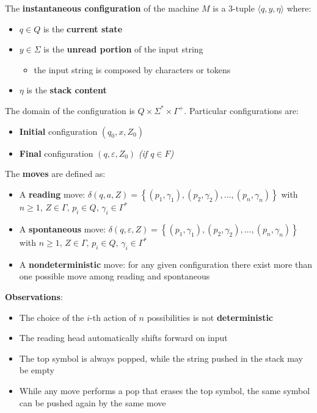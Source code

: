 \documentclass[english]{article}
\begin{document}
\bigskip
The \textbf{instantaneous configuration} of the machine \(M\) is a \(3\)-tuple \(\langle q, y, \eta \rangle\) where:

\begin{itemize}
  \item \(q \in Q\) is the \textbf{current state}
  \item \(y \in \Sigma\) is the \textbf{unread portion} of the input string
        \begin{itemize}
          \item the input string is composed by characters or tokens
        \end{itemize}
  \item \(\eta\) is the \textbf{stack content}
\end{itemize}

The domain of the configuration is \(Q \times \Sigma^\ast \times \Gamma^+\).
Particular configurations are:

\begin{itemize}
  \item \textbf{Initial} configuration \(\left( q_0, x, Z_0 \right)\)
  \item \textbf{Final} configuration \(\left( q, \varepsilon, Z_0 \right)\) \textit{(if \(q \in F\))}
\end{itemize}

\bigskip

The \textbf{moves} are defined as:

\begin{itemize}
  \item A \textbf{reading} move: \(\delta(q, a, Z) = \left\{ (p_1, \gamma_1), (p_2, \gamma_2), \ldots, (p_n, \gamma_n) \right\}\) with \(n \geq 1, \, Z \in \Gamma, \, p_i \in Q, \, \gamma_i \in \Gamma^\ast\)
  \item A \textbf{spontaneous} move: \(\delta(q, \varepsilon, Z) = \left\{ (p_1, \gamma_1), (p_2, \gamma_2), \ldots, (p_n, \gamma_n) \right\}\) with \(n \geq 1, \, Z \in \Gamma, \, p_i \in Q, \, \gamma_i \in \Gamma^\ast\)
  \item A \textbf{nondeterministic} move: for any given configuration there exist more than one possible move among reading and spontaneous
\end{itemize}

\textbf{Observations}:

\begin{itemize}
  \item The choice of the \(i\)-th action of \(n\) possibilities is not \textbf{deterministic}
  \item The reading head automatically shifts forward on input
  \item The top symbol is always popped, while the string pushed in the stack may be empty
  \item While any move performs a pop that erases the top symbol, the same symbol can be pushed again by the same move
\end{itemize}
\end{document}
